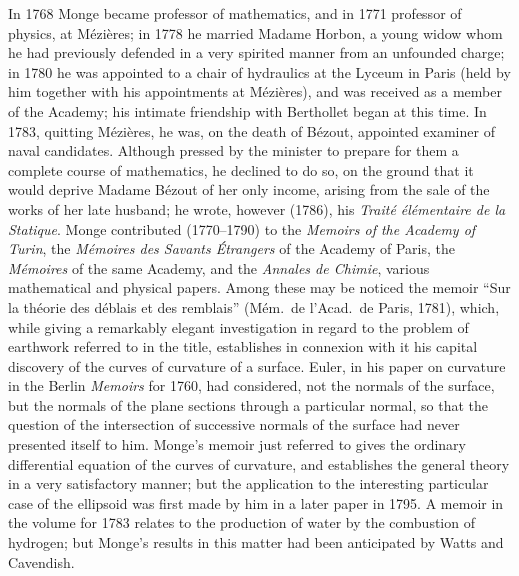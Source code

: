 \documentclass[11pt,a4paper]{book}
\begin{document}
In 1768 Monge became professor of mathematics, and in 1771 professor of physics, at M\'ezi\`eres; in 1778 he married Madame Horbon, a young widow whom he had previously defended in a very spirited manner from an unfounded charge; in 1780 he was appointed to a chair of hydraulics at the Lyceum in Paris (held by him together with his appointments at M\'ezi\`eres), and was received as a member of the Academy; his intimate friendship with Berthollet began at this time. In 1783, quitting M\'ezi\`eres, he was, on the death of B\'ezout, appointed examiner of naval candidates. Although pressed by the minister to prepare for them a complete course of mathematics, he declined to do so, on the ground that it would deprive Madame B\'ezout of her only income, arising from the sale of the works of her late husband; he wrote, however (1786), his \textit{Trait\'e \'el\'ementaire de la Statique}. Monge contributed (1770--1790) to the \textit{Memoirs of the Academy of Turin}, the \textit{M\'emoires des Savants \'Etrangers} of the Academy of Paris, the \textit{M\'emoires} of the same Academy, and the \textit{Annales de Chimie}, various mathematical and physical papers. Among these may be noticed the memoir ``Sur la th\'eorie des d\'eblais et des remblais'' (M\'em.\ de l'Acad.\ de Paris, 1781), which, while giving a remarkably elegant investigation in regard to the problem of earthwork referred to in the title, establishes in connexion with it his capital discovery of the curves of curvature of a surface. Euler, in his paper on curvature in the Berlin \textit{Memoirs} for 1760, had considered, not the normals of the surface, but the normals of the plane sections through a particular normal, so that the question of the intersection of successive normals of the surface had never presented itself to him. Monge's memoir just referred to gives the ordinary differential equation of the curves of curvature, and establishes the general theory in a very satisfactory manner; but the application to the interesting particular case of the ellipsoid was first made by him in a later paper in 1795. A memoir in the volume for 1783 relates to the production of water by the combustion of hydrogen; but Monge's results in this matter had been anticipated by Watts and Cavendish.
\end{document}
